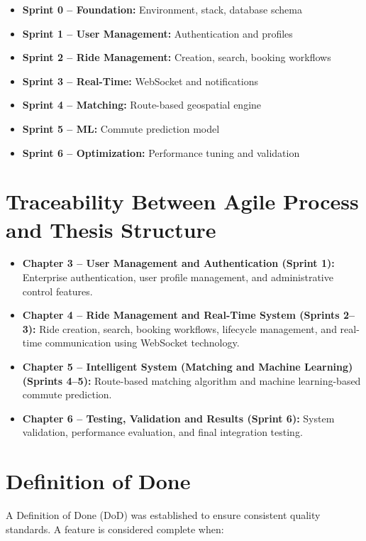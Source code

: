 \begin{itemize}
    \item \textbf{Sprint 0 -- Foundation:} Environment, stack, database schema
    \item \textbf{Sprint 1 -- User Management:} Authentication and profiles
    \item \textbf{Sprint 2 -- Ride Management:} Creation, search, booking workflows
    \item \textbf{Sprint 3 -- Real-Time:} WebSocket and notifications
    \item \textbf{Sprint 4 -- Matching:} Route-based geospatial engine
    \item \textbf{Sprint 5 -- ML:} Commute prediction model
    \item \textbf{Sprint 6 -- Optimization:} Performance tuning and validation
\end{itemize}

\section{Traceability Between Agile Process and Thesis Structure}

\begin{itemize}
    \item \textbf{Chapter 3 -- User Management and Authentication (Sprint 1):} Enterprise authentication, user profile management, and administrative control features.

    \item \textbf{Chapter 4 -- Ride Management and Real-Time System (Sprints 2--3):} Ride creation, search, booking workflows, lifecycle management, and real-time communication using WebSocket technology.

    \item \textbf{Chapter 5 -- Intelligent System (Matching and Machine Learning) (Sprints 4--5):} Route-based matching algorithm and machine learning-based commute prediction.

    \item \textbf{Chapter 6 -- Testing, Validation and Results (Sprint 6):} System validation, performance evaluation, and final integration testing.
\end{itemize}
\section{Definition of Done}

A Definition of Done (DoD) was established to ensure consistent quality standards. A feature is considered complete when:


